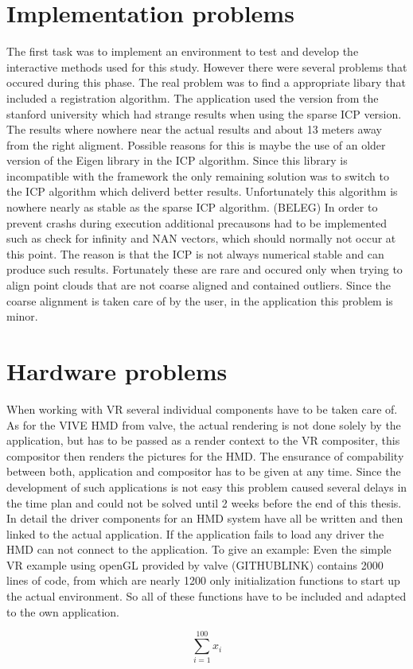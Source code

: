 \documentclass[hyperref,english,bachelorofscience,bibnum]{cgvpub}
\begin{document}
\section{Implementation problems}

The first task was to implement an environment to test and develop the interactive methods used for this study.
However there were several problems that occured during this phase. The real problem was to find a appropriate libary that included a registration algorithm. The application used the version from the stanford university which had strange results when using the sparse ICP version. The results where nowhere near the actual results and about 13 meters away from the right aligment. Possible reasons for this is maybe the use of an older version of the Eigen library in the ICP algorithm. Since this library is incompatible with the framework the only remaining solution was to switch to the ICP algorithm which deliverd better results. Unfortunately this algorithm is nowhere nearly as stable as the sparse ICP algorithm. (BELEG) In order to prevent crashs during execution additional precausons had to be implemented such as check for infinity and NAN vectors, which should normally not occur at this point. The reason is that the ICP is not always numerical stable and can produce such results. Fortunately these are rare and occured only when trying to align point clouds that are not coarse aligned and contained outliers. Since the coarse alignment is taken care of by the user, in the application this problem is minor.

\section{Hardware problems}

When working with VR several individual components have to be taken care of. As for the VIVE HMD from valve, the actual rendering is not done solely by the application, but has to be passed as a render context to the VR compositer, this compositor then renders the pictures for the HMD. The ensurance of compability between both, application and compositor has to be given at any time. Since the development of such applications is not easy this problem caused several delays in the time plan and could not be solved until 2 weeks before the end of this thesis. In detail the driver components for an HMD system have all be written and then linked to the actual application. If the application fails to load any driver the HMD can not connect to the application. To give an example: Even the simple VR example using openGL provided by valve (GITHUBLINK) contains 2000 lines of code, from which are nearly 1200 only initialization functions to start up the actual environment. So all of these functions have to be included and adapted to the own application.




\[
\sum_{i=1}^{100}x_i
\]


\cite*{}
\end{document}
